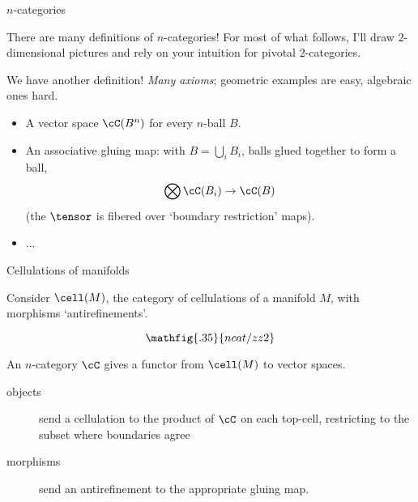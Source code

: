 \documentclass[beamer, compress]{beamer}
\begin{document}
\begin{frame}{$n$-categories}
\begin{block}{There are many definitions of $n$-categories!}
For most of what follows, I'll draw $2$-dimensional pictures and rely on your intuition for pivotal $2$-categories. 
\end{block}
\begin{block}{We have another definition!}
\emph{Many axioms}; geometric examples are easy, algebraic ones hard.
\begin{itemize}
\item A vector space $\cC(B^n)$ for every $n$-ball $B$.
\item An associative gluing map: with $B = \bigcup_i B_i$, balls glued together to form a ball,
$$\bigotimes \cC(B_i) \to \cC(B)$$
(the $\tensor$ is fibered over `boundary restriction' maps).
\item ...
\end{itemize}
\end{block}
\end{frame}

\begin{frame}{Cellulations of manifolds}
\begin{block}{}
Consider $\cell(M)$, the category of cellulations of a manifold $M$, with morphisms `antirefinements'.
\end{block}
\vspace{-4mm}
$$\mathfig{.35}{ncat/zz2}$$
\vspace{-4mm}
\begin{block}{}
An $n$-category $\cC$ gives a functor from $\cell(M)$ to vector spaces.
\begin{description}
\item[objects] send a cellulation to the product of $\cC$ on each top-cell, restricting to the subset where boundaries agree
\item[morphisms] send an antirefinement to the appropriate gluing map.
\end{description}
\end{block}
\end{frame}
\end{document}
